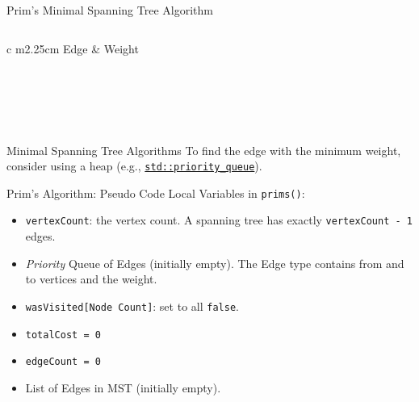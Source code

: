 \documentclass[14pt,aspectratio=1610]{beamer}
\begin{document}
\begin{frame}{Prim's Minimal Spanning Tree Algorithm}
\begin{columns}
  \begin{tabular}{c m{2.25cm}}
  \toprule
    Edge & Weight\\
  \midrule
    \\
    \\
    \\
    \\
  \bottomrule
  \end{tabular}
\end{columns}
\end{frame}

\begin{frame}{Minimal Spanning Tree Algorithms}
  \large\center%
To find the edge with the minimum weight, consider using a heap (e.g., \href{https://en.cppreference.com/w/cpp/container/priority_queue.html}{\texttt{std::priority\_queue}}).
\end{frame}

\begin{frame}{Prim's Algorithm: Pseudo Code}
Local Variables in \texttt{prims()}:
\begin{itemize}
  \item
    \texttt{vertexCount}: the vertex count. A spanning tree has exactly \lstinline{vertexCount - 1} edges.
  \item
    \emph{Priority} Queue of Edges (initially empty). The Edge type contains from and to vertices and the weight.
  \item
    \texttt{wasVisited{[Node Count]}}: set to all \texttt{false}.
  \item
    \texttt{totalCost = 0}
  \item
    \texttt{edgeCount = 0}
  \item
    List of Edges in MST (initially empty).
\end{itemize}
\end{frame}
\end{document}
